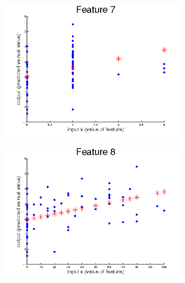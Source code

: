 \documentclass{article}
\begin{document}
	\begin{figure}[H]
	  \begin{subfigure}
	    \centering
	    \includegraphics[scale=0.4,bb=0 0 576 432]{task2-feature7.png}
	  \end{subfigure}
	  \begin{subfigure}
	    \centering
	    \includegraphics[scale=0.4,bb=0 0 576 432]{task2-feature8.png}
	  \end{subfigure}
	\end{figure}
	
\end{document}
